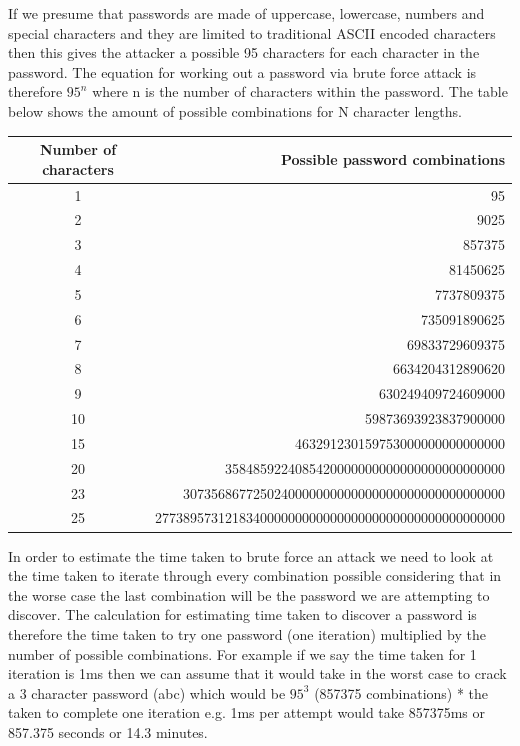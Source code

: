\documentclass[a4paper, twoside, 11pt]{article}
\begin{document}
If we presume that passwords are made of uppercase, lowercase, numbers and special characters and they are
limited to traditional ASCII encoded characters then this gives the attacker a possible 95 characters for each character in the password.
The equation for working out a password via brute force attack is therefore $95^n$ where n is the number of characters within the password.
The table below shows the amount of possible combinations for N character lengths.

\begin{center}
	\begin{tabular}{ |c|r| } 
	 \hline
	 Number of characters & Possible password combinations \\
	 \hline
	 1 & 95 \\
	 2 & 9025 \\
	 3 & 857375 \\
	 4 & 81450625 \\
	 5 & 7737809375 \\
	 6 & 735091890625 \\
	 7 & 69833729609375 \\
	 8 & 6634204312890620 \\
	 9 & 630249409724609000 \\
	 10 & 59873693923837900000 \\
	 15 & 463291230159753000000000000000 \\
	 20 & 3584859224085420000000000000000000000000 \\
	 23 & 3073568677250240000000000000000000000000000000 \\
	 25 & 27738957312183400000000000000000000000000000000000  \\
	 \hline
	\end{tabular}
\end{center}

In order to estimate the time taken to brute force an attack we need to look at the time taken to iterate through every combination possible
 considering that in the worse case the last combination will be the password we are attempting to discover.
The calculation for estimating time taken to discover a password is therefore the time taken to try one password (one iteration)
 multiplied by the number of possible combinations. For example if we say the time taken for 1 iteration is 1ms then we can assume that it
 would take in the worst case to crack a 3 character password (abc) which would be $95^3$ (857375 combinations) * the taken to complete one
 iteration e.g. 1ms per attempt would take 857375ms or 857.375 seconds or 14.3 minutes.
\end{document}
